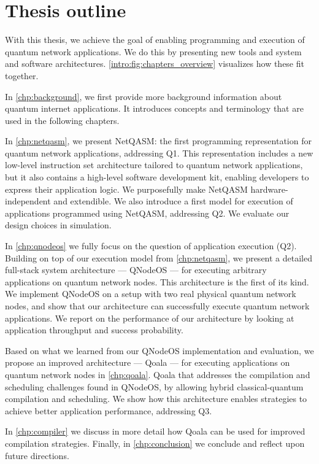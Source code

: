 \section{Thesis outline}
With this thesis, we achieve the goal of enabling programming and execution of quantum network applications.
We do this by presenting new tools and system and software architectures.
\cref{intro:fig:chapters_overview} visualizes how these fit together.

In \cref{chp:background}, we first provide more background information about quantum internet applications.
It introduces concepts and terminology that are used in the following chapters.

In \cref{chp:netqasm}, we present NetQASM: the first programming representation for quantum network applications, addressing Q1.
This representation includes a new low-level instruction set architecture tailored to quantum network applications,
but it also contains a high-level software development kit, enabling developers to express their application logic.
We purposefully make NetQASM hardware-independent and extendible.
We also introduce a first model for execution of applications programmed using NetQASM, addressing Q2.
We evaluate our design choices in simulation.

In \cref{chp:qnodeos} we fully focus on the question of application execution (Q2).
Building on top of our execution model from \cref{chp:netqasm}, we present a detailed full-stack system architecture --- QNodeOS --- for executing arbitrary applications on quantum network nodes.
This architecture is the first of its kind.
We implement QNodeOS on a setup with two real physical quantum network nodes, and show that our architecture can successfully execute quantum network applications.
We report on the performance of our architecture by looking at application throughput and success probability.


Based on what we learned from our QNodeOS implementation and evaluation, we propose an improved architecture --- Qoala --- for executing applications on quantum network nodes in \cref{chp:qoala}.
Qoala that addresses the compilation and scheduling challenges found in QNodeOS, by allowing hybrid classical-quantum compilation and scheduling.
We show how this architecture enables strategies to achieve better application performance, addressing Q3.

In \cref{chp:compiler} we discuss in more detail how Qoala can be used for improved compilation strategies.
Finally, in \cref{chp:conclusion} we conclude and reflect upon future directions.


